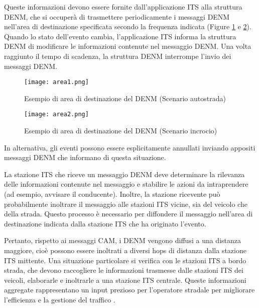 Queste informazioni devono essere fornite dall'applicazione ITS alla struttura DENM, che si occuperà di trasmettere periodicamente i messaggi DENM nell'area di destinazione specificata secondo la frequenza indicata (Figure \ref{fig:area1} e \ref{fig:area2}). Quando lo stato dell'evento cambia, l'applicazione ITS informa la struttura DENM di modificare le informazioni contenute nel messaggio DENM. Una volta raggiunto il tempo di scadenza, la struttura DENM interrompe l'invio dei messaggi DENM. 

\begin{figure}[h!]
    \centering
    \texttt{[image: area1.png]}
    \caption{Esempio di area di destinazione del DENM (Scenario autostrada)}
    \label{fig:area1}
\end{figure}

\begin{figure}[h!]
    \centering
    \texttt{[image: area2.png]}
    \caption{Esempio di area di destinazione del DENM (Scenario incrocio)}
    \label{fig:area2}
\end{figure}

In alternativa, gli eventi possono essere esplicitamente annullati inviando appositi messaggi DENM che informano di questa situazione.

La stazione ITS che riceve un messaggio DENM deve determinare la rilevanza delle informazioni contenute nel messaggio e stabilire le azioni da intraprendere (ad esempio, avvisare il conducente). Inoltre, la stazione ricevente può probabilmente inoltrare il messaggio alle stazioni ITS vicine, sia del veicolo che della strada. Questo processo è necessario per diffondere il messaggio nell'area di destinazione indicata dalla stazione ITS che ha originato l'evento. 

Pertanto, rispetto ai messaggi CAM, i DENM vengono diffusi a una distanza maggiore, cioè possono essere inoltrati a diversi hops di distanza dalla stazione ITS mittente. Una situazione particolare si verifica con le stazioni ITS a bordo strada, che devono raccogliere le informazioni trasmesse dalle stazioni ITS dei veicoli, elaborarle e inoltrarle a una stazione ITS centrale. Queste informazioni aggregate rappresentano un input prezioso per l'operatore stradale per migliorare l'efficienza e la gestione del traffico \cite{cam_denm}.


